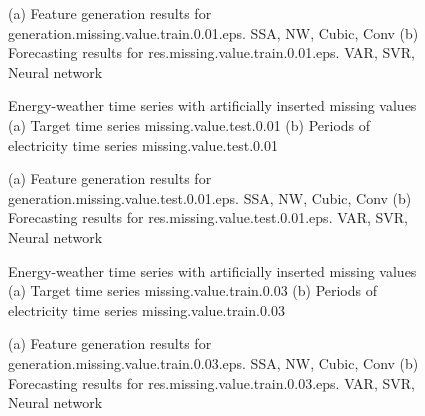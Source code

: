 \documentclass[12pt]{article}
\begin{document}
\begin{figure}
\centering
{}
\caption{(a)	Feature generation results for	generation.missing.value.train.0.01.eps.	SSA, NW, Cubic, Conv	(b)	Forecasting results for	res.missing.value.train.0.01.eps.	VAR, SVR, Neural network	}
\end{figure}


\begin{figure}
\centering
{}
\caption{Energy-weather time series with artificially inserted missing values	(a) Target time series	missing.value.test.0.01	(b) Periods of electricity time series	missing.value.test.0.01	}
\end{figure}


\begin{figure}
\centering
{}
\caption{(a)	Feature generation results for	generation.missing.value.test.0.01.eps.	SSA, NW, Cubic, Conv	(b)	Forecasting results for	res.missing.value.test.0.01.eps.	VAR, SVR, Neural network	}
\end{figure}


\begin{figure}
\centering
{}
\caption{Energy-weather time series with artificially inserted missing values	(a) Target time series	missing.value.train.0.03	(b) Periods of electricity time series	missing.value.train.0.03	}
\end{figure}


\begin{figure}
\centering
{}
\caption{(a)	Feature generation results for	generation.missing.value.train.0.03.eps.	SSA, NW, Cubic, Conv	(b)	Forecasting results for	res.missing.value.train.0.03.eps.	VAR, SVR, Neural network	}
\end{figure}
\end{document}
